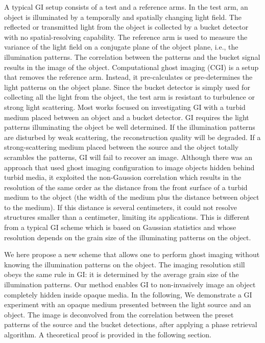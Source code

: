 \documentclass[amsmath,amssymb,aps,prl,groupedaddress,floatfix,12pt]{revtex4-1}
\begin{document}
A typical GI setup consists of a test and a reference arms. In the test arm, an object is illuminated by a temporally and spatially changing light field. The reflected or transmitted light from the object is collected by a bucket detector with no spatial-resolving capability. The reference arm is used to measure the variance of the light field on a conjugate plane of the object plane, i.e., the illumination patterns. The correlation between the patterns and the bucket signal results in the image of the object. Computational ghost imaging (CGI) is a setup that removes the reference arm. Instead, it pre-calculates or pre-determines the light patterns on the object plane. Since the bucket detector is simply used for collecting all the light from the object, the test arm is resistant to turbulence or strong light scattering. Most works focused on investigating GI with a turbid medium placed between an object and a bucket detector\cite{tajahuerce_image_2014,yang_lensless_2016,bai_imaging_2017,ye_embedding_2020}. GI requires the light patterns illuminating the object  be well determined. If the illumination patterns are disturbed by weak scattering, the reconstruction quality will be degraded\cite{bina_backscattering_2013,li_compressive_2020}. If a strong-scattering medium placed between the source and the object totally scrambles the patterns, GI will fail to recover an image\cite{gong_correlated_2011,yang_lensless_2016}. Although there was an approach that used ghost imaging configuration to image objects hidden behind turbid media, it exploited the non-Gaussion correlation which results in the resolution of the same order as the distance from the front surface of a turbid medium to the object (the width of the medium plus the distance between object to the medium)\cite{paniagua-diaz_blind_2019}. If this distance is several centimeters, it could not resolve structures smaller than a centimeter, limiting its applications. This is different from a typical GI scheme which is based on Gaussian statistics and whose resolution depends on the grain size of the illuminating patterns on the object\cite{ZhuGI2005,fayard_intensity_2015}. 

We here propose a new scheme that allows one to perform ghost imaging without knowing the illumination patterns on the object. The imaging resolution still obeys the same rule in GI: it is determined by the average grain size of the illumination patterns. Our method enables GI to non-invasively image an object completely hidden inside opaque media. 
In the following, We demonstrate a GI experiment with an opaque medium presented between the light source and an object.  The image is deconvolved from the correlation between the preset patterns of the source and the bucket detections, after applying a phase retrieval algorithm. A theoretical proof is provided in the following section.
\end{document}
